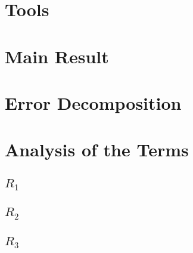 \section{Tools}
  
\section{Main Result}
  
\section{Error Decomposition}
  
\section{Analysis of the Terms}
  \subsection{$R_1$}
    
  \subsection{$R_2$}
    
  \subsection{$R_3$}
    

